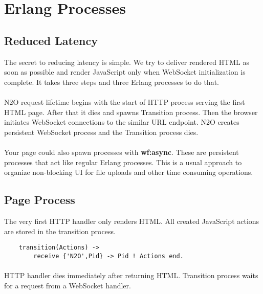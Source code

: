 \section{Erlang Processes}

\subsection{Reduced Latency}
The secret to reducing latency is simple. We try to deliver rendered HTML
as soon as possible and render JavaScript only when WebSocket initialization is complete.
It takes three steps and three Erlang processes to do that.


\paragraph{}
N2O request lifetime begins with the start of HTTP process serving the first HTML page.
After that it dies and spawns Transition process.
Then the browser initiates WebSocket connections to the similar URL endpoint.
N2O creates persistent WebSocket process and the Transition process dies.

\paragraph{}
Your page could also spawn processes with {\bf wf:async}.
These are persistent processes that act like regular Erlang processes.
This is a usual approach to organize non-blocking UI for file uploads and other time consuming operations.

\newpage
\subsection{Page Process}
The very first HTTP handler only renders HTML. All created
JavaScript actions are stored in the transition process.

\vspace{1\baselineskip}
\begin{lstlisting}
    transition(Actions) ->
        receive {'N2O',Pid} -> Pid ! Actions end.
\end{lstlisting}

\paragraph{}
HTTP handler dies immediately after returning HTML. Transition process
waits for a request from a WebSocket handler.

